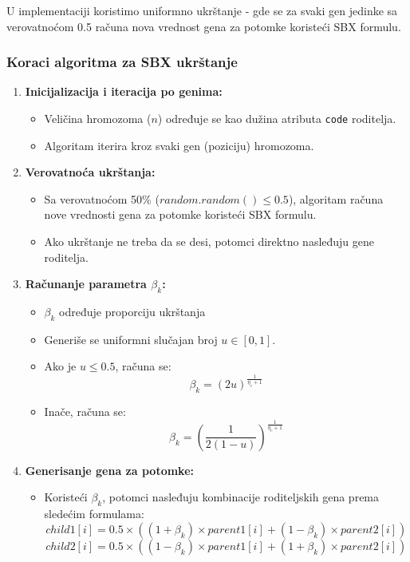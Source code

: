 \documentclass[12pt]{article}
\begin{document}
U implementaciji koristimo uniformno ukrštanje - gde se za svaki gen jedinke sa verovatnoćom 0.5 računa nova vrednost gena za potomke koristeći SBX formulu.


\subsubsection*{Koraci algoritma za SBX ukrštanje}
\begin{enumerate}
    \item \textbf{Inicijalizacija i iteracija po genima:}
    \begin{itemize}
        \item Veličina hromozoma ($n$) određuje se kao dužina atributa \texttt{code} roditelja.
        \item Algoritam iterira kroz svaki gen (poziciju) hromozoma.
    \end{itemize}
    
    \item \textbf{Verovatnoća ukrštanja:}
    \begin{itemize}
        \item Sa verovatnoćom 50\% ($random.random() \leq 0.5$), algoritam računa nove vrednosti gena za potomke koristeći SBX formulu.
        \item Ako ukrštanje ne treba da se desi, potomci direktno nasleđuju gene roditelja.
    \end{itemize}
    
    \item \textbf{Računanje parametra $\beta_k$:}
    \begin{itemize}
    	\item $\beta_k$ određuje proporciju ukrštanja
        \item Generiše se uniformni slučajan broj $u \in [0,1]$.
        \item Ako je $u \leq 0.5$, računa se:
        \[
        \beta_k = (2u)^{\frac{1}{\eta_c + 1}}
        \]
        \item Inače, računa se:
        \[
        \beta_k = \left(\frac{1}{2(1-u)}\right)^{\frac{1}{\eta_c + 1}}
        \]
    \end{itemize}
    
    \item \textbf{Generisanje gena za potomke:}
    \begin{itemize}
        \item Koristeći $\beta_k$, potomci nasleđuju kombinacije roditeljskih gena prema sledećim formulama:
        \[
        child1[i] = 0.5 \times ((1 + \beta_k) \times parent1[i] + (1 - \beta_k) \times parent2[i])
        \]
        \[
        child2[i] = 0.5 \times ((1 - \beta_k) \times parent1[i] + (1 + \beta_k) \times parent2[i])
        \]
    \end{itemize}
    

\end{enumerate}
\end{document}
